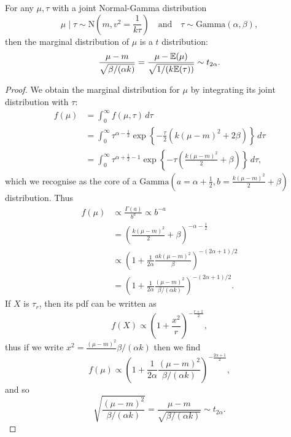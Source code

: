 \documentclass[10pt, a4paper]{article}
\begin{document}
\begin{proposition}
    For any $\mu, \tau$ with a joint Normal-Gamma distribution
    \[
    \mu \mid \tau \sim \mathrm{N}\left(m, v ^ 2 = \frac{1}{k\tau}\right)\quad\text{and}\quad\tau \sim \mathrm{Gamma}(\alpha, \beta),
    \]
    then the marginal distribution of $\mu$ is a $t$ distribution:
    \[
    \frac{\mu - m}{\sqrt{\beta / (\alpha k)}} = \frac{\mu - \mathbb{E}(\mu)}{\sqrt{1 / (k\mathbb{E}(\tau))}} \sim t_{2\alpha}.
    \]

    \begin{proof}
        We obtain the marginal distribution for $\mu$ by integrating its joint distribution with $\tau$:
        \begin{align*}
            f(\mu) &= \int_{0}^{\infty}f(\mu, \tau)\,d\tau \\
            &= \int_{0}^{\infty}\tau ^ {\alpha - \frac{1}{2}}\exp\left\{-\frac{\tau}{2}(k(\mu - m) ^ 2 + 2\beta)\right\}\,d\tau \\
            &= \int_{0}^{\infty}\tau ^ {\alpha + \frac{1}{2} - 1}\exp\left\{-\tau\left(\frac{k(\mu - m) ^ 2}{2} + \beta\right)\right\}\,d\tau,
        \end{align*}
        which we recognise as the core of a $\mathrm{Gamma}(a = \alpha + \frac{1}{2}, b = \frac{k(\mu - m) ^ 2}{2} + \beta)$ distribution.
        Thus
        \begin{align*}
            f(\mu) &\propto \frac{\Gamma(a)}{b ^ a} \propto b ^ {-a} \\
            &= \left(\frac{k(\mu - m) ^ 2}{2} + \beta\right) ^ {-\alpha - \frac{1}{2}} \\
            &\propto \left(1 + \frac{1}{2\alpha}\frac{ak(\mu - m) ^ 2}{\beta}\right) ^ {-(2\alpha + 1) / 2} \\
            &= \left(1 + \frac{1}{2\alpha}\frac{(\mu - m) ^ 2}{\beta / (\alpha k)}\right) ^ {-(2\alpha + 1) / 2}.
        \end{align*}
        If $X$ is $\tau_r$,
        then its pdf can be written as
        \[
        f(X) \propto \left(1 + \frac{x ^ 2}r\right) ^ {-\frac{r + 1}{2}},
        \]
        thus if we write $x ^ 2 = \frac{(\mu - m) ^ 2}{}\beta / (\alpha k)$ then we find
        \[
        f(\mu) \propto \left(1 + \frac{1}{2\alpha}\frac{(\mu - m) ^ 2}{\beta / (\alpha k)}\right) ^ {-\frac{2\alpha + 1}{2}},
        \]
        and so
        \[
        \sqrt{\frac{(\mu - m) ^ 2}{\beta / (\alpha k)}} = \frac{\mu - m}{\sqrt{\beta / (\alpha k)}} \sim t_{2\alpha}.
        \]
    \end{proof}
\end{proposition}
\end{document}
